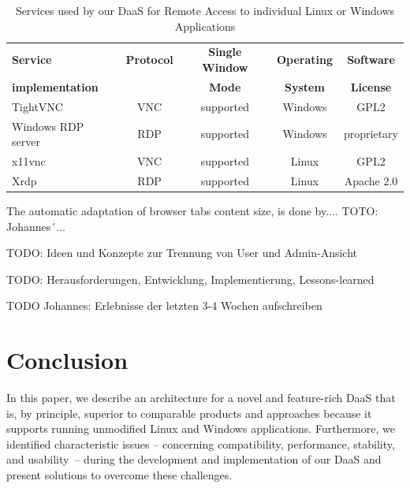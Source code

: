 \documentclass[runningheads]{llncs}
\begin{document}
\begin{table}
	\centering
	\caption{Services used by our DaaS for Remote Access to individual Linux or Windows Applications}
	\begin{tabular}{|l|c|c|c|c|}
		\hline
		\textbf{Service}    &  \textbf{Protocol}  & \textbf{Single Window}       & \textbf{Operating} & \textbf{Software}  \\
		\textbf{implementation}  &                & \textbf{Mode}                & \textbf{System}    & \textbf{License}   \\
		\hline
		TightVNC            &  VNC                & supported                    & Windows            & GPL2               \\
		\hline
		Windows RDP server  &  RDP                & supported                    & Windows            & proprietary        \\
		\hline
		x11vnc              &  VNC                & supported                    & Linux              & GPL2               \\
		\hline
		Xrdp                &  RDP                & supported                    & Linux              & Apache 2.0         \\
		\hline
	\end{tabular}
	\label{tab:DaaS_Services_Overview}
\end{table}

The automatic adaptation of browser tabs content size, is done by.... TOTO: Johannes´...

TODO: Ideen und Konzepte zur Trennung von User und Admin-Ansicht

TODO: Herausforderungen, Entwicklung, Implementierung, Lessons-learned

TODO Johannes: Erlebnisse der letzten 3-4 Wochen aufschreiben



\section{Conclusion}
\label{sec:Conclusions}

In this paper, we describe an architecture for a novel and feature-rich DaaS that is, by principle, superior to comparable products and approaches because it supports running unmodified Linux and Windows applications. Furthermore, we identified characteristic issues -- concerning compatibility, performance, stability, and usability -- during the development and implementation of our DaaS and present solutions to overcome these challenges. 
\end{document}
